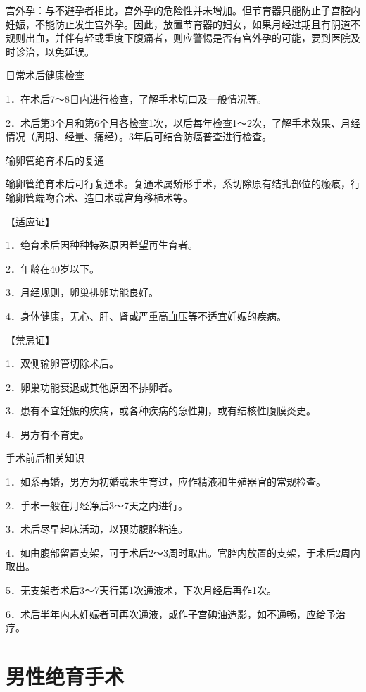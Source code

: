 \documentclass[12pt,UTF8,openany]{ctexbook}
\begin{document}
宫外孕：与不避孕者相比，宫外孕的危险性并未增加。但节育器只能防止子宫腔内妊娠，不能防止发生宫外孕。因此，放置节育器的妇女，如果月经过期且有阴道不规则出血，并伴有轻或重度下腹痛者，则应警惕是否有宫外孕的可能，要到医院及时诊治，以免延误。





日常术后健康检查


1．在术后7～8日内进行检查，了解手术切口及一般情况等。

2．术后第3个月和第6个月各检查1次，以后每年检查1～2次，了解手术效果、月经情况（周期、经量、痛经）。3年后可结合防癌普查进行检查。





输卵管绝育术后的复通


输卵管绝育术后可行复通术。复通术属矫形手术，系切除原有结扎部位的瘢痕，行输卵管端吻合术、造口术或宫角移植术等。

【适应证】

1．绝育术后因种种特殊原因希望再生育者。

2．年龄在40岁以下。

3．月经规则，卵巢排卵功能良好。

4．身体健康，无心、肝、肾或严重高血压等不适宜妊娠的疾病。

【禁忌证】

1．双侧输卵管切除术后。

2．卵巢功能衰退或其他原因不排卵者。

3．患有不宜妊娠的疾病，或各种疾病的急性期，或有结核性腹膜炎史。

4．男方有不育史。





手术前后相关知识


1．如系再婚，男方为初婚或未生育过，应作精液和生殖器官的常规检查。

2．手术一般在月经净后3～7天之内进行。

3．术后尽早起床活动，以预防腹腔粘连。

4．如由腹部留置支架，可于术后2～3周时取出。官腔内放置的支架，于术后2周内取出。

5．无支架者术后3～7天行第1次通液术，下次月经后再作1次。

6．术后半年内未妊娠者可再次通液，或作子宫碘油造影，如不通畅，应给予治疗。





\chapter{男性绝育手术}
\end{document}
